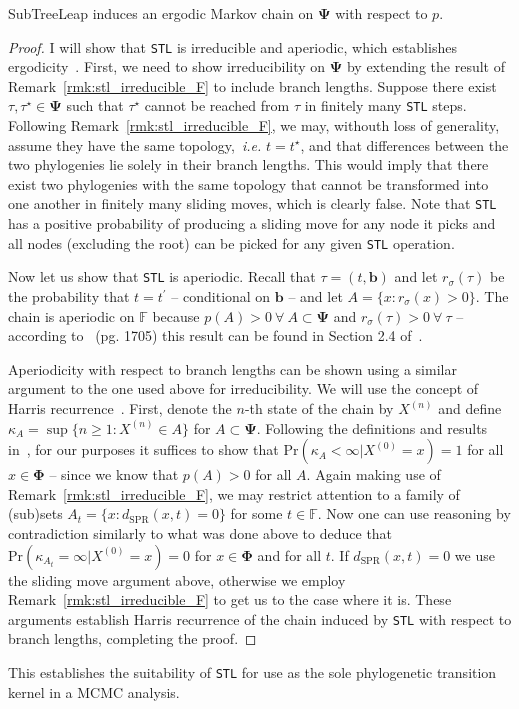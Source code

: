 \begin{theorem}
\label{thm:stl_ergodic}
 SubTreeLeap induces an ergodic Markov chain on $\boldsymbol\Psi$ with respect to $p$. %
\end{theorem}
\begin{proof}
 I will show that \verb|STL| is irreducible and aperiodic, which establishes ergodicity~\citep{Meyn1993,Roberts2004,Dinh2017}.
 First, we need to show irreducibility on $\boldsymbol\Psi$ by extending the result of Remark~\ref{rmk:stl_irreducible_F} to include branch lengths.
 Suppose there exist $\tau, \tau^\star \in \boldsymbol\Psi$ such that $\tau^\star$ cannot be reached from $\tau$ in finitely many \verb|STL| steps.
 Following Remark~\ref{rmk:stl_irreducible_F}, we may, withouth loss of generality, assume they have the same topology,~\textit{i.e.} $t = t^\star$, and that differences between the two phylogenies lie solely in their branch lengths.
 This would imply that there exist two phylogenies with the same topology that cannot be transformed into one another in finitely many sliding moves, which is clearly false.
 Note that \verb|STL| has a positive probability of producing a sliding move for any node it picks and all nodes (excluding the root) can be picked for any given \verb|STL| operation.
 
 Now let us show that \verb|STL| is aperiodic.
 Recall that $\tau  = (t, \boldsymbol b)$ and let $r_\sigma(\tau)$ be the probability that $t = t^\prime$ -- conditional on $\boldsymbol b$ -- and let $A = \{x : r_\sigma(x) > 0\}$.
 The chain is aperiodic on $\mathbb{F}$ because $ p(A) > 0 \: \forall \: A \subset \boldsymbol \Psi$ and $r_\sigma(\tau) > 0 \: \forall \: \tau $  -- according to~\cite{Tierney1994} (pg. 1705) this result can be found in Section 2.4 of~\cite{Nummelin1984}.

 Aperiodicity with respect to branch lengths can be shown using a similar argument to the one used above for irreducibility.
 We will use the concept of Harris recurrence~\citep{Harris1956,Chan1994,Tierney1994}.
 First, denote the $n$-th state of the chain by $X^{(n)}$ and define $\kappa_A = \sup \{ n \geq 1 : X^{(n)} \in A \} $ for $A \subset \boldsymbol \Psi$.
 Following the definitions and results in~\cite{Roberts2006}, for our purposes it suffices to show that $\text{Pr}(\kappa_A < \infty | X^{(0)} = x) = 1$ for all $x \in \boldsymbol \Phi$ -- since we know that $p(A) > 0$ for all $A$.
 Again making use of Remark~\ref{rmk:stl_irreducible_F}, we may restrict attention to a family of (sub)sets $A_t = \{x : d_{\text{SPR}}(x, t) = 0 \}$ for some $t \in \mathbb{F}$.
 Now one can use reasoning by contradiction similarly to what was done above to deduce that $\text{Pr}(\kappa_{A_t} = \infty | X^{(0)} = x) = 0$ for $x \in \boldsymbol \Phi$ and for all $t$.
 If $d_{\text{SPR}}(x, t) = 0$ we use the sliding move argument above, otherwise we employ Remark~\ref{rmk:stl_irreducible_F} to get us to the case where it is.
 These arguments establish Harris recurrence of the chain induced by \verb|STL| with respect to branch lengths, completing the proof.
\end{proof}
This establishes the suitability of \verb|STL| for use as the sole phylogenetic transition kernel in a MCMC analysis.

